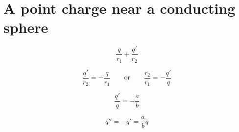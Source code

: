 \section{A point charge near a conducting sphere}

\begin{equation*}
  \frac{q}{r_1} + \frac{q'}{r_2}
\end{equation*}

\begin{equation*}
  \frac{q'}{r_2} = - \frac{q}{r_1}
  \qquad \mathrm{or} \qquad
  \frac{r_2}{r_1} = - \frac{q'}{q}
\end{equation*}

\begin{equation}
  \frac{q'}{q} = - \frac{a}{b}
\end{equation}

\begin{equation}
  q'' = -q' = \frac{a}{b} q
\end{equation}

